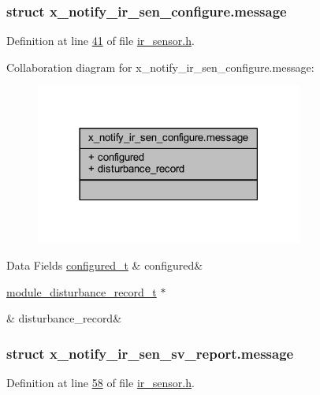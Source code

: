\subsubsection{struct x\+\_\+notify\+\_\+ir\+\_\+sen\+\_\+configure.\+message}


Definition at line \hyperlink{a00017_source_l00041}{41} of file \hyperlink{a00017_source}{ir\+\_\+sensor.\+h}.



Collaboration diagram for x\+\_\+notify\+\_\+ir\+\_\+sen\+\_\+configure.\+message\+:\nopagebreak
\begin{figure}[H]
\begin{center}
\leavevmode
\includegraphics[width=249pt]{d4/ddc/a00917}
\end{center}
\end{figure}
\begin{DoxyFields}{Data Fields}
\hypertarget{a00017_a48e54afcf03ca45bfe38f6b7ff58764a}{\hyperlink{a00021_d6/d9c/a00352}{configured\+\_\+t}}\label{a00017_a48e54afcf03ca45bfe38f6b7ff58764a}
&
configured&
\\
\hline

\hypertarget{a00017_af7361f7710e5f5389134744aaa60254e}{\hyperlink{a00028}{module\+\_\+disturbance\+\_\+record\+\_\+t} $\ast$}\label{a00017_af7361f7710e5f5389134744aaa60254e}
&
disturbance\+\_\+record&
\\
\hline

\end{DoxyFields}
\label{da/de6/a00855}
\hypertarget{a00017_da/de6/a00855}{}
\subsubsection{struct x\+\_\+notify\+\_\+ir\+\_\+sen\+\_\+sv\+\_\+report.\+message}


Definition at line \hyperlink{a00017_source_l00058}{58} of file \hyperlink{a00017_source}{ir\+\_\+sensor.\+h}.



